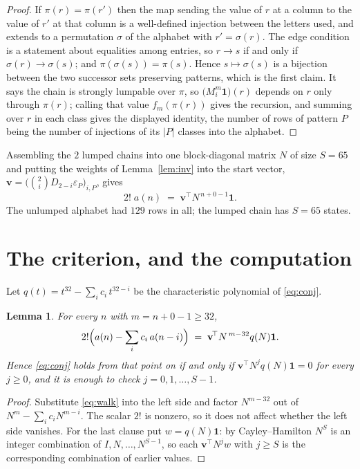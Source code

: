 \documentclass[11pt,a4paper]{article}
\theoremstyle{plain}
\newtheorem{lemma}[theorem]{Lemma}
\theoremstyle{definition}
\begin{document}
\begin{proof}
If $\pi(r)=\pi(r')$ then the map sending the value of $r$ at a column to the value of $r'$
at that column is a well-defined injection between the letters used, and extends to a
permutation $\sigma$ of the alphabet with $r'=\sigma(r)$. The edge condition is a statement
about equalities among entries, so $r\to s$ if and only if $\sigma(r)\to\sigma(s)$; and
$\pi(\sigma(s))=\pi(s)$. Hence $s\mapsto\sigma(s)$ is a bijection between the two successor
sets preserving patterns, which is the first claim. It says the chain is strongly lumpable
over $\pi$, so $\bigl(M_i^{m}\mathbf{1}\bigr)(r)$ depends on $r$ only through $\pi(r)$;
calling that value $f_m(\pi(r))$ gives the recursion, and summing over $r$ in each class
gives the displayed identity, the number of rows of pattern $P$ being the number of
injections of its $|P|$ classes into the alphabet.
\end{proof}

Assembling the $2$ lumped chains into one block-diagonal matrix $N$ of size $S=65$ and
putting the weights of Lemma~\ref{lem:inv} into the start vector,
$\mathbf{v}=\bigl(\binom{2}{i}D_{2-i}\varepsilon_P\bigr)_{i,P}$, gives
\begin{equation}\label{eq:walk}
2!\;a(n)\;=\;\mathbf{v}^{\!\top}N^{\,n+0-1}\mathbf{1} .
\end{equation}
The unlumped alphabet had $129$ rows in all; the lumped chain has $S=65$ states.

\section{The criterion, and the computation}

Let $q(t)=t^{32}-\sum_i c_i\,t^{32-i}$ be the characteristic polynomial of
\eqref{eq:conj}.

\begin{lemma}\label{lem:crit}
For every $n$ with $m=n+0-1\ge32$,
\[
2!\Bigl(a(n)-\sum_i c_i\,a(n-i)\Bigr)\;=\;\mathbf{v}^{\!\top}N^{\,m-32}q(N)\mathbf{1} .
\]
Hence \eqref{eq:conj} holds from that point on if and only if
$\mathbf{v}^{\!\top}N^{j}q(N)\mathbf{1}=0$ for every $j\ge0$, and it is enough to check
$j=0,1,\dots,S-1$.
\end{lemma}

\begin{proof}
Substitute \eqref{eq:walk} into the left side and factor $N^{m-32}$ out of
$N^{m}-\sum_i c_iN^{m-i}$. The scalar $2!$ is nonzero, so it does not affect whether
the left side vanishes. For the last clause put $w=q(N)\mathbf{1}$: by Cayley--Hamilton
$N^{S}$ is an integer combination of $I,N,\dots,N^{S-1}$, so each
$\mathbf{v}^{\!\top}N^{j}w$ with $j\ge S$ is the corresponding combination of earlier
values.
\end{proof}
\end{document}
